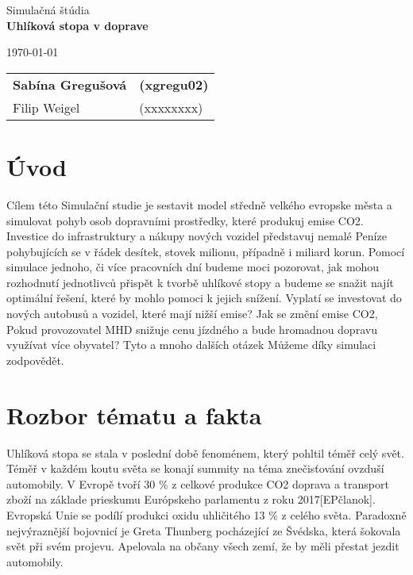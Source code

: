 \documentclass[a4paper, 11pt]{article}
\begin{document}
\begin{titlepage}
\begin{center}


\Huge{Simulačná štúdia} \\
\LARGE{\textbf{Uhlíková stopa v doprave}} \\

\end{center}

\begin{minipage}{0.5 \textwidth}
\Large
\today
\end{minipage}
\hfill
\begin{minipage}[r]{0.5 \textwidth}
\Large
\begin{tabular}{ll}
\textbf{Sabína Gregušová} & \textbf{(xgregu02)} \\
Filip Weigel & (xxxxxxxx)
\end{tabular}
\end{minipage}
\end{titlepage}

\clearpage
\tableofcontents


\clearpage
{}
\setcounter{page}{1}

\section{Úvod}
Cílem této Simulační studie je sestavit model středně velkého evropske města a simulovat pohyb osob dopravními prostředky, které produkuj emise CO2. Investice do infrastruktury a nákupy nových vozidel představuj nemalé Peníze pohybujících se v řádek desítek, stovek milionu, případně i miliard korun. Pomocí simulace jednoho, či více pracovních dní budeme moci pozorovat, jak mohou rozhodnutí jednotlivců přispět k tvorbě uhlíkové stopy a budeme se snažit najít optimální řešení, které by mohlo pomoci k jejich snížení. Vyplatí se investovat do nových autobusů a vozidel, které mají nižší emise? Jak se změní emise CO2, Pokud provozovatel MHD snižuje cenu jízdného a bude hromadnou dopravu využívat více obyvatel? Tyto a mnoho dalších otázek Můžeme díky simulaci zodpovědět.

\section{Rozbor tématu a fakta}
Uhlíková stopa se stala v poslední době fenoménem, který pohltil téměř celý svět. Téměř v každém koutu světa se konají summity na téma znečisťování ovzduší automobily. V Evropě tvoří 30 \% z celkové produkce CO2 doprava a transport zboží na základe prieskumu Európskeho parlamentu z roku 2017[EPčlanok]. Evropská Unie se podílí produkci oxidu uhličitého 13 \% z celého světa. Paradoxně nejvýraznější bojovnicí je Greta Thunberg pocházející ze Švédska, která šokovala svět při svém projevu. Apelovala na občany všech zemí, že by měli přestat jezdit automobily.
\end{document}
